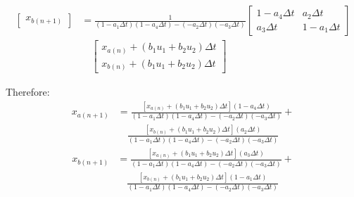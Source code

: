 \documentclass[11pt]{article}
\begin{document}
\begin{subequations}
\begin{align}
\begin{bmatrix}
      x_{b(n+1)}
    \end{bmatrix} &=
    \frac{1}{(1 - a_1\Delta t)(1 - a_4\Delta t) -(- a_2\Delta t)(- a_3\Delta t) }
    \begin{bmatrix}
      1 - a_4\Delta t & a_2\Delta t \\
      a_3\Delta t & 1 - a_1\Delta t
    \end{bmatrix} \\ \nonumber
    &\quad
    \begin{bmatrix}
      x_{a(n)} + (b_1 u_1 + b_2 u_2)\Delta t \\
      x_{b(n)} + (b_1 u_1 + b_2 u_2)\Delta t
    \end{bmatrix}
  \end{align}
\end{subequations}

Therefore:
\begin{subequations}
  \begin{align}
    x_{a(n+1)} &= \frac{\left[x_{a(n)} + (b_1 u_1 + b_2 u_2)\Delta t\right](1 - a_4\Delta t)}{(1 - a_1\Delta t)(1 - a_4\Delta t) - (- a_2\Delta t)(- a_3\Delta t)} + \\ \nonumber
    &\quad \frac{\left[x_{b(n)} + (b_1 u_1 + b_2 u_2)\Delta t\right](a_2\Delta t)}{(1 - a_1\Delta t)(1 - a_4\Delta t) - (- a_2\Delta t)(- a_3\Delta t)}
  \end{align}
\end{subequations}
\begin{subequations}
  \begin{align}
    x_{b(n+1)} &= \frac{\left[x_{a(n)} + (b_1 u_1 + b_2 u_2)\Delta t\right](a_3\Delta t)}{(1 - a_1\Delta t)(1 - a_4\Delta t) - (- a_2\Delta t)(- a_3\Delta t)} + \\ \nonumber
    &\quad \frac{\left[x_{b(n)} + (b_1 u_1 + b_2 u_2)\Delta t\right](1 - a_1\Delta t)}{(1 - a_1\Delta t)(1 - a_4\Delta t) - (- a_2\Delta t)(- a_3\Delta t)}
  \end{align}
\end{subequations}
\end{document}
